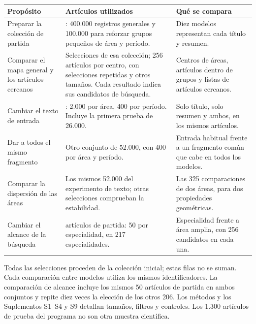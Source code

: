 \par\noindent\begin{minipage}{\linewidth}
\small
\setlength{\tabcolsep}{4pt}
\renewcommand{\arraystretch}{1.10}
\label{tab:T01}
\begin{tabular}{@{}>{\raggedright\arraybackslash}p{4.25cm}>{\raggedright\arraybackslash}p{6.1cm}>{\raggedright\arraybackslash}p{4.8cm}@{}}
\toprule
\textbf{Propósito} & \textbf{Artículos utilizados} & \textbf{Qué se compara} \\
\midrule
Preparar la colección de partida & 500.000: 400.000 registros generales y 100.000 para reforzar grupos pequeños de área y período. & Diez modelos representan cada título y resumen. \\
\addlinespace[8pt]
Comparar el mapa general y los artículos cercanos & Selecciones de esa colección; 256 artículos por centro, con selecciones repetidas y otros tamaños. Cada resultado indica sus candidatos de búsqueda. & Centros de áreas, artículos dentro de grupos y listas de artículos cercanos. \\
\addlinespace[8pt]
Cambiar el texto de entrada & 52.000: 2.000 por área, 400 por período. Incluye la primera prueba de 26.000. & Solo título, solo resumen y ambos, en los mismos artículos. \\
\addlinespace[8pt]
Dar a todos el mismo fragmento & Otro conjunto de 52.000, con 400 por área y período. & Entrada habitual frente a un fragmento común que cabe en todos los modelos. \\
\addlinespace[8pt]
Comparar la dispersión de las áreas & Los mismos 52.000 del experimento de texto; otras selecciones comprueban la estabilidad. & Las 325 comparaciones de dos áreas, para dos propiedades geométricas. \\
\addlinespace[8pt]
Cambiar el alcance de la búsqueda & 10.850 artículos de partida: 50 por especialidad, en 217 especialidades. & Especialidad frente a área amplia, con 256 candidatos en cada una. \\
\bottomrule
\end{tabular}
\par\smallskip
Todas las selecciones proceden de la colección inicial; estas filas no se suman. Cada comparación entre modelos utiliza los mismos identificadores. La comparación de alcance incluye los mismos 50 artículos de partida en ambos conjuntos y repite diez veces la elección de los otros 206. Los métodos y los Suplementos S1--S4 y S9 detallan tamaños, filtros y controles. Los 1.300 artículos de prueba del programa no son otra muestra científica.
\end{minipage}\par
